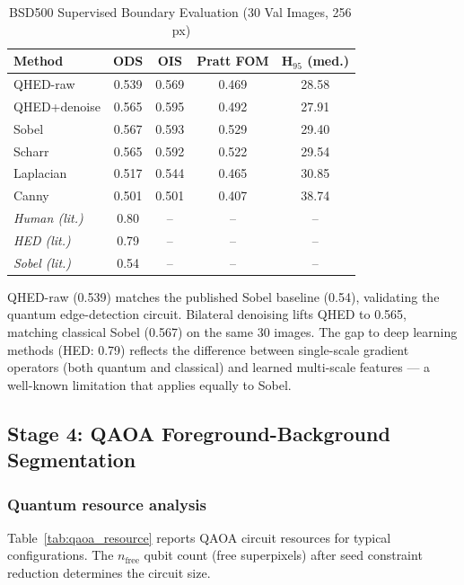 \documentclass[journal]{IEEEtran}
\begin{document}
\begin{table}[!t]
\renewcommand{\arraystretch}{1.2}
\caption{BSD500 Supervised Boundary Evaluation (30 Val Images, 256\,px)}
\label{tab:bsds}
\centering
\begin{tabular}{lcccc}
\toprule
Method & ODS & OIS & Pratt FOM & H$_{95}$ (med.) \\
\midrule
QHED-raw         & 0.539 & 0.569 & 0.469 & 28.58 \\
QHED+denoise     & 0.565 & 0.595 & 0.492 & 27.91 \\
Sobel            & 0.567 & 0.593 & 0.529 & 29.40 \\
Scharr           & 0.565 & 0.592 & 0.522 & 29.54 \\
Laplacian        & 0.517 & 0.544 & 0.465 & 30.85 \\
Canny            & 0.501 & 0.501 & 0.407 & 38.74 \\
\midrule
\textit{Human (lit.)} & 0.80 & -- & -- & -- \\
\textit{HED (lit.)}   & 0.79 & -- & -- & -- \\
\textit{Sobel (lit.)} & 0.54 & -- & -- & -- \\
\bottomrule
\end{tabular}
\end{table}

QHED-raw (0.539) matches the published Sobel baseline (0.54), validating the
quantum edge-detection circuit.  Bilateral denoising lifts QHED to 0.565,
matching classical Sobel (0.567) on the same 30 images.  The gap to deep
learning methods (HED: 0.79) reflects the difference between single-scale
gradient operators (both quantum and classical) and learned multi-scale features
— a well-known limitation that applies equally to Sobel.

\subsection{Stage 4: QAOA Foreground-Background Segmentation}

\subsubsection{Quantum resource analysis}

Table~\ref{tab:qaoa_resource} reports QAOA circuit resources for typical
configurations.  The $n_{\text{free}}$ qubit count (free superpixels) after
seed constraint reduction determines the circuit size.
\end{document}
